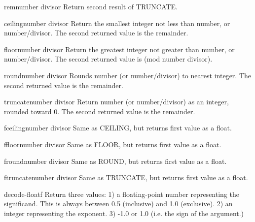 \documentclass[10pt,english]{book}
\begin{document}
\begin{function}{rem}{number divisor}
  Return second result of TRUNCATE.
\end{function}

\begin{function}{ceiling}{number \op divisor}
  Return the smallest integer not less than number, or number/divisor.
  The second returned value is the remainder.
\end{function}

\begin{function}{floor}{number \op divisor}
  Return the greatest integer not greater than number, or number/divisor.
  The second returned value is (mod number divisor).
\end{function}

\begin{function}{round}{number \op divisor}
  Rounds number (or number/divisor) to nearest integer.
  The second returned value is the remainder.
\end{function}

\begin{function}{truncate}{number \op divisor}
  Return number (or number/divisor) as an integer, rounded toward 0.
  The second returned value is the remainder.
\end{function}

\begin{function}{fceiling}{number \op divisor}
  Same as CEILING, but returns first value as a float.
\end{function}

\begin{function}{ffloor}{number \op divisor}
  Same as FLOOR, but returns first value as a float.
\end{function}

\begin{function}{fround}{number \op divisor}
  Same as ROUND, but returns first value as a float.
\end{function}

\begin{function}{ftruncate}{number \op divisor}
  Same as TRUNCATE, but returns first value as a float.
\end{function}

\begin{function}{decode-float}{f}
  Return three values:
   1) a floating-point number representing the significand. This is always
      between 0.5 (inclusive) and 1.0 (exclusive).
   2) an integer representing the exponent.
   3) -1.0 or 1.0 (i.e. the sign of the argument.)
\end{function}
\end{document}
